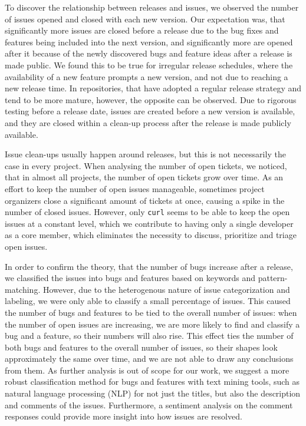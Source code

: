 To discover the relationship between releases and issues, we observed the number of issues opened and closed with each new version. Our expectation was, that significantly more issues are closed before a release due to the bug fixes and features being included into the next version, and significantly more are opened after it because of the newly discovered bugs and feature ideas after a release is made public. We found this to be true for irregular release schedules, where the availability of a new feature prompts a new version, and not due to reaching a new release time. In repositories, that have adopted a regular release strategy and tend to be more mature, however, the opposite can be observed. Due to rigorous testing before a release date, issues are created before a new version is available, and they are closed within a clean-up process after the release is made publicly available.

Issue clean-ups usually happen around releases, but this is not necessarily the case in every project. When analysing the number of open tickets, we noticed, that in almost all projects, the number of open tickets grow over time. As an effort to keep the number of open issues manageable, sometimes project organizers close a significant amount of tickets at once, causing a spike in the number of closed issues. However, only \texttt{curl} seems to be able to keep the open issues at a constant level, which we contribute to having only a single developer as a core member, which eliminates the necessity to discuss, prioritize and triage open issues.

In order to confirm the theory, that the number of bugs increase after a release, we classified the issues into bugs and features based on keywords and pattern-matching. However, due to the heterogenous nature of issue categorization and labeling, we were only able to classify a small percentage of issues. This caused the number of bugs and features to be tied to the overall number of issues: when the number of open issues are increasing, we are more likely to find and classify a bug and a feature, so their numbers will also rise. This effect ties the number of both bugs and features to the overall number of issues, so their shapes look approximately the same over time, and we are not able to draw any conclusions from them. As further analysis is out of scope for our work, we suggest a more robust classification method for bugs and features with text mining tools, such as natural language processing (NLP) for not just the titles, but also the description and comments of the issues. Furthermore, a sentiment analysis on the comment responses could provide more insight into how issues are resolved.

